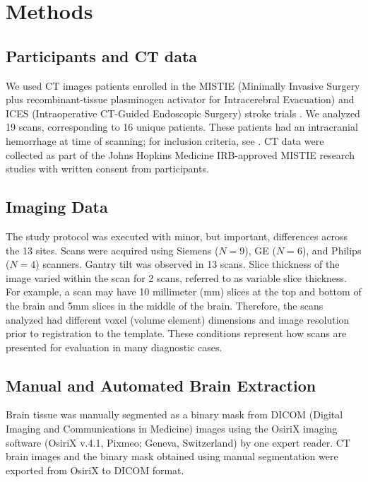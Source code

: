 \documentclass{elsarticle}\usepackage[]{graphicx}\usepackage[]{color}
\begin{document}
\section{Methods}
\subsection{ Participants and CT data}
We used CT images patients enrolled in the MISTIE (Minimally Invasive Surgery plus recombinant-tissue plasminogen activator for Intracerebral Evacuation) and ICES (Intraoperative CT-Guided Endoscopic Surgery) stroke trials \citep{morgan_preliminary_2008}.  We analyzed 19 scans, corresponding to 16 unique patients.  These patients had an intracranial hemorrhage at time of scanning; for inclusion criteria, see \citet{mould_minimally_2013}. CT data were collected as part of the Johns Hopkins Medicine IRB-approved MISTIE research studies with written consent from participants.  


\subsection{Imaging Data}
The study protocol was executed with minor, but important, differences across the 13 sites.  Scans were acquired using Siemens ($N=9$), GE ($N=6$), and Philips ($N=4$) scanners. Gantry tilt was observed in 13 scans.  
Slice thickness of the image varied within the scan for 2 scans, referred to as variable slice thickness. For example, a scan may have 10 millimeter (mm) slices at the top and bottom of the brain and 5mm slices in the middle of the brain.  Therefore, the scans analyzed had different voxel (volume element) dimensions and image resolution prior to registration to the template.  These conditions represent how scans are presented for evaluation in many diagnostic cases.


\subsection{Manual and Automated Brain Extraction}
Brain tissue was manually segmented as a binary mask from DICOM (Digital Imaging and Communications in Medicine) images using the OsiriX imaging software (OsiriX v.4.1, Pixmeo; Geneva, Switzerland) by one expert reader. 
CT brain images and the binary mask obtained using manual segmentation were exported from OsiriX to DICOM format.  
\end{document}
